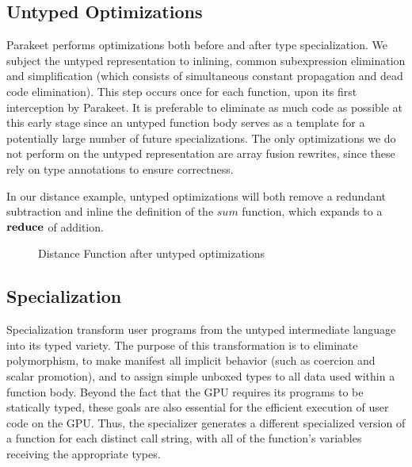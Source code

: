 \documentclass[10pt,twocolumn]{article}
\begin{document}
\subsection{Untyped Optimizations}
Parakeet performs optimizations both before and after type specialization. We subject the untyped representation to inlining, common subexpression elimination and simplification (which consists of simultaneous constant propagation and dead code elimination). This step occurs once for each function, upon its first interception by Parakeet. It is preferable to eliminate as much code as possible at this early stage since an untyped function body serves as a template for a potentially large number of future specializations. The only optimizations we do not perform on the untyped representation are array fusion rewrites, since these rely on type annotations to ensure correctness.

In our distance example, untyped optimizations will both remove a redundant subtraction and inline the definition of the $sum$ function, which expands to a $\mbox{\textbf{reduce}}$ of addition.
\begin{figure}[h!]
\caption{Distance Function after untyped optimizations}
\end{figure}

\subsection{Specialization}
Specialization transform user programs from the untyped intermediate language into its typed variety. The purpose of this transformation is to eliminate polymorphism, to make manifest all implicit behavior (such as coercion and scalar promotion), and to assign simple unboxed types to all data used within a function body. Beyond the fact that the GPU requires its programs to be statically typed, these goals are also essential for the efficient execution of user code on the GPU. Thus, the specializer generates a different specialized version of a function for each distinct call string, with all of the function's variables receiving the appropriate types.
\end{document}
